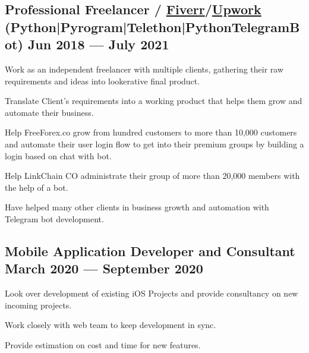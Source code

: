 \documentclass[letter,10pt]{article}
\begin{document}
\subsection{{Professional Freelancer / \href{https://www.fiverr.com/users/takausrazeem}{Fiverr}/\href{https://www.upwork.com/freelancers/~018bcc7acbf1d3e149}{Upwork} (Python|Pyrogram|Telethon|PythonTelegramBot) \hfill Jun 2018 --- July 2021}}
\begin{zitemize}
\item Work as an independent freelancer with multiple clients, gathering their raw requirements and ideas into lookerative final product.
\item Translate Client's requirements into a working product that helps them grow and automate their business.
\item Help FreeForex.co grow from hundred customers to more than 10,000 customers and automate their user login flow to get into their premium groups by building a login based on chat with bot.
\item Help LinkChain CO administrate their group of more than 20,000 members with the help of a bot.
\item Have helped many other clients in business growth and automation with Telegram bot development.
\end{zitemize}

\subsection{{Mobile Application Developer and Consultant \hfill March 2020 --- September 2020}}
\begin{zitemize}
\item Look over development of existing iOS Projects and provide consultancy on new incoming projects.
\item Work closely with web team to keep development in sync.
\item Provide estimation on cost and time for new features.
\end{zitemize}

\end{document}
